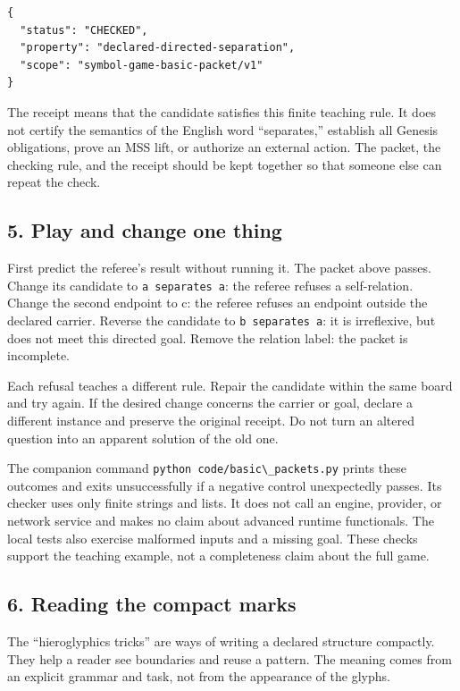 \documentclass[
  11pt,
]{article}
\newcommand{\passthrough}[1]{#1}
\begin{document}
\begin{lstlisting}
{
  "status": "CHECKED",
  "property": "declared-directed-separation",
  "scope": "symbol-game-basic-packet/v1"
}
\end{lstlisting}

The receipt means that the candidate satisfies this finite teaching
rule. It does not certify the semantics of the English word
``separates,'' establish all Genesis obligations, prove an MSS lift, or
authorize an external action. The packet, the checking rule, and the
receipt should be kept together so that someone else can repeat the
check.

\subsection{5. Play and change one
thing}\label{play-and-change-one-thing}

First predict the referee's result without running it. The packet above
passes. Change its candidate to \passthrough{\lstinline!a separates a!}:
the referee refuses a self-relation. Change the second endpoint to c:
the referee refuses an endpoint outside the declared carrier. Reverse
the candidate to \passthrough{\lstinline!b separates a!}: it is
irreflexive, but does not meet this directed goal. Remove the relation
label: the packet is incomplete.

Each refusal teaches a different rule. Repair the candidate within the
same board and try again. If the desired change concerns the carrier or
goal, declare a different instance and preserve the original receipt. Do
not turn an altered question into an apparent solution of the old one.

The companion command
\passthrough{\lstinline!python code/basic\_packets.py!} prints these
outcomes and exits unsuccessfully if a negative control unexpectedly
passes. Its checker uses only finite strings and lists. It does not call
an engine, provider, or network service and makes no claim about
advanced runtime functionals. The local tests also exercise malformed
inputs and a missing goal. These checks support the teaching example,
not a completeness claim about the full game.

\subsection{6. Reading the compact
marks}\label{reading-the-compact-marks}

The ``hieroglyphics tricks'' are ways of writing a declared structure
compactly. They help a reader see boundaries and reuse a pattern. The
meaning comes from an explicit grammar and task, not from the appearance
of the glyphs.
\end{document}
